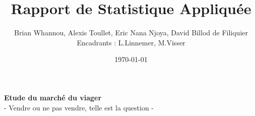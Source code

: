 \documentclass[12pt,a4paper]{article}
\title{\textbf{Rapport de Statistique Appliquée}}
\author{Brian Whannou, Alexis Toullet, Eric Nana Njoya, David Billod de Filiquier\\
Encadrants : L.Linnemer, M.Visser}
\date{\today}
\begin{document}
\begin{titlepage}

\maketitle

\vspace{5cm}

\hrulefill
\begin{center}
 \begin{huge}
\textbf{Etude du marché du viager}\\
\vspace{1cm}
 - Vendre ou ne pas vendre, telle est la question - 
 \end{huge}
 \end{center} 

\hrulefill


\end{titlepage}
\end{document}
